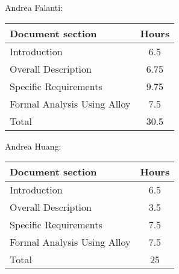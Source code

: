 Andrea Falanti:

\begin{tabular}{|l|c|}
    \hline
    Document section & Hours \\
    \hline
     Introduction & 6.5\\
     Overall Description & 6.75\\
     Specific Requirements & 9.75\\
     Formal Analysis Using Alloy & 7.5\\
     \hline
     Total & 30.5\\
     \hline
\end{tabular}
\vskip 0.3in

Andrea Huang:

\begin{tabular}{|l|c|}
    \hline
    Document section & Hours \\
    \hline
     Introduction &  6.5\\
     Overall Description & 3.5\\
     Specific Requirements & 7.5\\
     Formal Analysis Using Alloy & 7.5\\
     \hline
     Total & 25\\
     \hline
\end{tabular}